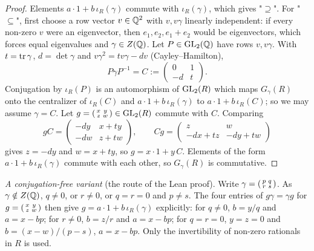 \begin{theorem}
\end{theorem}
\begin{proof}
Elements $a\cdot1+b\,\iota_R(\gamma)$ commute with $\iota_R(\gamma)$, which gives "$\supseteq$". For "$\subseteq$", first choose a row vector
$v\in\mathbb{Q}^2$ with $v,v\gamma$ linearly independent: if every non-zero $v$ were an eigenvector, then $e_1,e_2,e_1+e_2$ would be eigenvectors,
which forces equal eigenvalues and $\gamma\in Z(\mathbb{Q})$. Let $P\in\mathrm{GL}_2(\mathbb{Q})$ have rows $v,v\gamma$. With $t=\operatorname{tr}\gamma$, $d=\det\gamma$ and
$v\gamma^2=tv\gamma-dv$ (Cayley--Hamilton),
\[
  P\gamma P^{-1}=C:=\begin{pmatrix}0&1\\-d&t\end{pmatrix}.
\]
Conjugation by $\iota_R(P)$ is an automorphism of $\mathrm{GL}_2(R)$ which maps $G_\gamma(R)$ onto the centralizer of $\iota_R(C)$ and
$a\cdot1+b\,\iota_R(\gamma)$ to $a\cdot1+b\,\iota_R(C)$; so we may assume $\gamma=C$. Let $g=\begin{psmallmatrix}x&y\\z&w\end{psmallmatrix}\in\mathrm{GL}_2(R)$ commute with
$C$. Comparing
\[
  gC=\begin{pmatrix}-dy&x+ty\\-dw&z+tw\end{pmatrix},\qquad Cg=\begin{pmatrix}z&w\\-dx+tz&-dy+tw\end{pmatrix}
\]
gives $z=-dy$ and $w=x+ty$, so $g=x\cdot1+y\,C$. Elements of the form $a\cdot1+b\,\iota_R(\gamma)$ commute with each other, so $G_\gamma(R)$ is
commutative.
\end{proof}
\noindent\emph{A conjugation-free variant} (the route of the Lean proof). Write $\gamma=\begin{psmallmatrix}p&q\\r&s\end{psmallmatrix}$. As $\gamma\notin Z(\mathbb{Q})$,
$q\ne0$, or $r\ne0$, or $q=r=0$ and $p\ne s$. The four entries of $g\gamma=\gamma g$ for $g=\begin{psmallmatrix}x&y\\z&w\end{psmallmatrix}$ then give
$g=a\cdot1+b\,\iota_R(\gamma)$ explicitly: for $q\ne0$, $b=y/q$ and $a=x-bp$; for $r\ne0$, $b=z/r$ and $a=x-bp$; for $q=r=0$, $y=z=0$ and
$b=(x-w)/(p-s)$, $a=x-bp$. Only the invertibility of non-zero rationals in $R$ is used.

